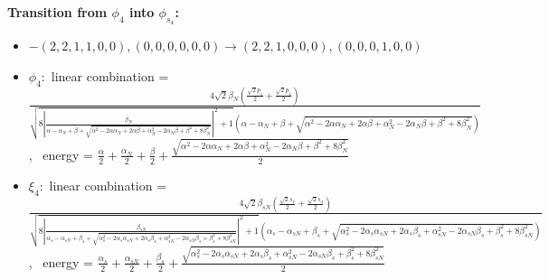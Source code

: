 \documentclass[12pt,a4paper]{article}
\begin{document}
        \noindent\textbf{Transition from $\phi_{4}$ into $\phi_{s_{4}}$:}
        \begin{itemize}
            \item $- (2, 2, 1, 1, 0, 0), (0, 0, 0, 0, 0, 0) \rightarrow (2, 2, 1, 0, 0, 0), (0, 0, 0, 1, 0, 0)$
        
            \item $\phi_{4}:$ linear combination = $\frac{4 \sqrt{2} \beta_{N} \left(\frac{\sqrt{2} p_{1}}{2} + \frac{\sqrt{2} p_{4}}{2}\right)}{\sqrt{8 \left|{\frac{\beta_{N}}{\alpha - \alpha_{N} + \beta + \sqrt{\alpha^{2} - 2 \alpha \alpha_{N} + 2 \alpha \beta + \alpha_{N}^{2} - 2 \alpha_{N} \beta + \beta^{2} + 8 \beta_{N}^{2}}}}\right|^{2} + 1} \left(\alpha - \alpha_{N} + \beta + \sqrt{\alpha^{2} - 2 \alpha \alpha_{N} + 2 \alpha \beta + \alpha_{N}^{2} - 2 \alpha_{N} \beta + \beta^{2} + 8 \beta_{N}^{2}}\right)}$, \
            energy = $\frac{\alpha}{2} + \frac{\alpha_{N}}{2} + \frac{\beta}{2} + \frac{\sqrt{\alpha^{2} - 2 \alpha \alpha_{N} + 2 \alpha \beta + \alpha_{N}^{2} - 2 \alpha_{N} \beta + \beta^{2} + 8 \beta_{N}^{2}}}{2}$
            
            \item $\xi_{4}:$ linear combination = $\frac{4 \sqrt{2} \beta_{s N} \left(\frac{\sqrt{2} s_{1}}{2} + \frac{\sqrt{2} s_{4}}{2}\right)}{\sqrt{8 \left|{\frac{\beta_{s N}}{\alpha_{s} - \alpha_{s N} + \beta_{s} + \sqrt{\alpha_{s}^{2} - 2 \alpha_{s} \alpha_{s N} + 2 \alpha_{s} \beta_{s} + \alpha_{s N}^{2} - 2 \alpha_{s N} \beta_{s} + \beta_{s}^{2} + 8 \beta_{s N}^{2}}}}\right|^{2} + 1} \left(\alpha_{s} - \alpha_{s N} + \beta_{s} + \sqrt{\alpha_{s}^{2} - 2 \alpha_{s} \alpha_{s N} + 2 \alpha_{s} \beta_{s} + \alpha_{s N}^{2} - 2 \alpha_{s N} \beta_{s} + \beta_{s}^{2} + 8 \beta_{s N}^{2}}\right)}$, \
            energy = $\frac{\alpha_{s}}{2} + \frac{\alpha_{s N}}{2} + \frac{\beta_{s}}{2} + \frac{\sqrt{\alpha_{s}^{2} - 2 \alpha_{s} \alpha_{s N} + 2 \alpha_{s} \beta_{s} + \alpha_{s N}^{2} - 2 \alpha_{s N} \beta_{s} + \beta_{s}^{2} + 8 \beta_{s N}^{2}}}{2}$
            

\end{itemize}
\end{document}
